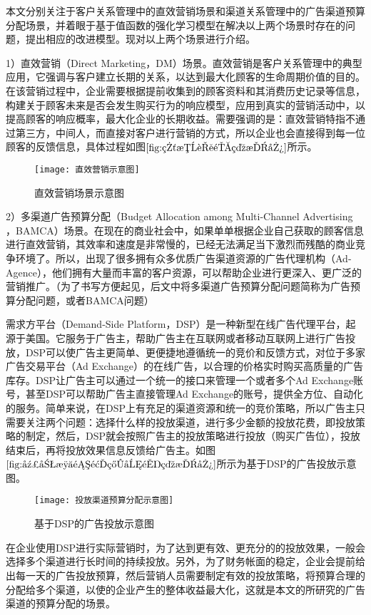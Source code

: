 本文分别关注于客户关系管理中的直效营销场景和渠道关系管理中的广告渠道预算分配场景，并着眼于基于值函数的强化学习模型在解决以上两个场景时存在的问题，提出相应的改进模型。现对以上两个场景进行介绍。

1）直效营销（Direct Marketing，DM）场景。直效营销是客户关系管理中的典型应用，它强调与客户建立长期的关系，以达到最大化顾客的生命周期价值的目的。在该营销过程中，企业需要根据提前收集到的顾客资料和其消费历史记录等信息，构建关于顾客未来是否会发生购买行为的响应模型，应用到真实的营销活动中，以提高顾客的响应概率，最大化企业的长期收益。需要强调的是：直效营销特指不通过第三方，中间人，而直接对客户进行营销的方式，所以企业也会直接得到每一位顾客的反馈信息，具体过程如图$\ref{fig:直效营销示意图}$所示。
\begin{figure}[htbp]
\centering
\texttt{[image: 直效营销示意图]}
\caption{直效营销场景示意图}
\label{fig:直效营销示意图}
\end{figure}

2）多渠道广告预算分配（Budget Allocation among Multi-Channel Advertising ，BAMCA）场景。在现在的商业社会中，如果单单根据企业自己获取的顾客信息进行直效营销，其效率和速度是非常慢的，已经无法满足当下激烈而残酷的商业竞争环境了。所以，出现了很多拥有众多优质广告渠道资源的广告代理机构（Ad-Agence），他们拥有大量而丰富的客户资源，可以帮助企业进行更深入、更广泛的营销推广。（为了书写方便起见，后文中将多渠道广告预算分配问题简称为广告预算分配问题，或者BAMCA问题）

需求方平台（Demand-Side Platform，DSP）是一种新型在线广告代理平台，起源于美国。它服务于广告主，帮助广告主在互联网或者移动互联网上进行广告投放，DSP可以使广告主更简单、更便捷地遵循统一的竞价和反馈方式，对位于多家广告交易平台（Ad Exchange）的在线广告，以合理的价格实时购买高质量的广告库存。DSP让广告主可以通过一个统一的接口来管理一个或者多个Ad Exchange账号，甚至DSP可以帮助广告主直接管理Ad Exchange的账号，提供全方位、自动化的服务。简单来说，在DSP上有充足的渠道资源和统一的竞价策略，所以广告主只需要关注两个问题：选择什么样的投放渠道，进行多少金额的投放花费，即投放策略的制定，然后，DSP就会按照广告主的投放策略进行投放（购买广告位），投放结束后，再将投放效果信息反馈给广告主。如图$\ref{fig:广告渠道预算分配示意图}$所示为基于DSP的广告投放示意图。
\begin{figure}[htbp]
\centering
\texttt{[image: 投放渠道预算分配示意图]}
\caption{基于DSP的广告投放示意图}
\label{fig:广告渠道预算分配示意图}
\end{figure}

在企业使用DSP进行实际营销时，为了达到更有效、更充分的的投放效果，一般会选择多个渠道进行长时间的持续投放。另外，为了财务帐面的稳定，企业会提前给出每一天的广告投放预算，然后营销人员需要制定有效的投放策略，将预算合理的分配给多个渠道，以使的企业产生的整体收益最大化，这就是本文的所研究的广告渠道的预算分配的场景。


